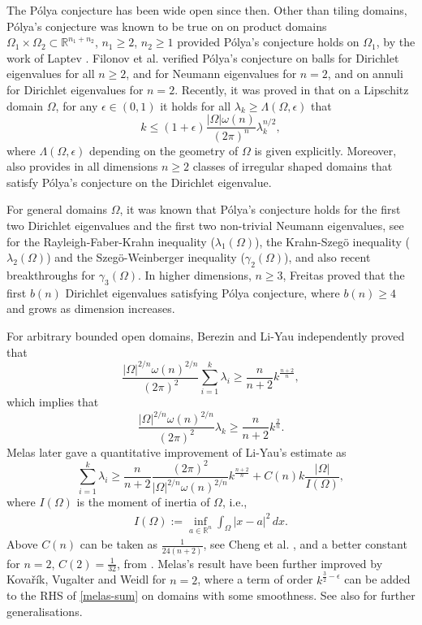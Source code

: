 \documentclass[11pt,twoside, leqno]{article}
\def\rr{{\mathbb R}}
\def\rn{{{\rr}^n}}
\numberwithin{equation}{section}
\begin{document}
The P\'olya conjecture has been wide open since then. Other than tiling domains,
P\'olya's conjecture was known to be true on on product domains $\Omega_1\times\Omega_2\subset\rr^{n_1+n_2}$, $n_1\ge 2$,
$n_2\ge 1$ provided P\'olya's conjecture holds on $\Omega_1$,  by the work of Laptev \cite{La97}. Filonov et al. \cite{FLPS23,FLPS25}
verified P\'olya's conjecture on balls for Dirichlet eigenvalues for all $n\ge 2$, and for Neumann eigenvalues for $n=2$,
and on annuli  for Dirichlet eigenvalues for $n=2$. Recently, it was proved in \cite{JL25} that on a Lipschitz domain $\Omega$, for any $\epsilon\in (0,1)$ it holds for all
$\lambda_k\ge \Lambda(\Omega,\epsilon)$ that
$$k\le (1+\epsilon)\frac{|\Omega|\omega(n)}{(2\pi)^n}\lambda_k^{n/2},$$
where $\Lambda(\Omega,\epsilon)$ depending on the geometry of $\Omega$ is given explicitly. Moreover, \cite{JL25} also provides in all dimensions $n\ge 2$ classes of
irregular shaped domains that satisfy P\'olya's conjecture on the Dirichlet eigenvalue.


For general domains $\Omega$, it was known that P\'olya's conjecture holds for the first two Dirichlet eigenvalues and the first two non-trivial Neumann eigenvalues,
see  \cite{Henrot06}  for the Rayleigh-Faber-Krahn inequality ($\lambda_1(\Omega)$),   the Krahn-Szeg\"o inequality  ($\lambda_2(\Omega)$) and the
Szeg\"o-Weinberger inequality ($\gamma_2(\Omega)$),  and also recent breakthroughs   \cite{BuHe19,GNP09}  for $\gamma_3(\Omega)$.  In higher dimensions, $n\ge 3$, Freitas \cite{Fre19} proved that
the first $b(n)$ Dirichlet eigenvalues satisfying P\'olya conjecture, where $b(n)\ge 4$ and grows as dimension increases.

For arbitrary bounded open domains,
Berezin \cite{Berezin72} and  Li-Yau \cite{LY83} independently proved that
\begin{equation}\label{ly-sum}
\frac{ |\Omega|^{2/n}\omega(n)^{2/n}}{(2\pi)^2}\sum_{i=1}^k\lambda_i \ge \frac{n}{n+2} k^{\frac{n+2}{n}},
\end{equation}
which implies that
\begin{equation}\label{ly-eigenvalue}
\frac{ |\Omega|^{2/n}\omega(n)^{2/n}}{(2\pi)^2} \lambda_k \ge \frac{n}{n+2} k^{\frac{2}{n}}.
\end{equation}
Melas \cite{Me02} later gave a quantitative improvement of Li-Yau's estimate
as
\begin{equation}\label{melas-sum}
\sum_{i=1}^k\lambda_i \ge \frac{n}{n+2} \frac{(2\pi)^2}{ |\Omega|^{2/n}\omega(n)^{2/n}} k^{\frac{n+2}{n}}+C(n)k\frac{|\Omega|}{I(\Omega)},
\end{equation}
where $I(\Omega)$ is the moment of inertia of $\Omega$, i.e.,
\begin{align}\label{I-def}
I(\Omega):=\inf_{a\in\rn}\int_\Omega|x-a|^2\,dx.
\end{align}
Above $C(n)$ can be taken as $\frac{1}{24(n+2)}$, see Cheng et al. \cite[p. 36]{CQW13}, and a better constant for $n=2$, $C(2)=\frac{1}{32}$, from  \cite[(16)]{KVW09}.
Melas's result have been further improved by Kova\v{r}\'ik, Vugalter and Weidl \cite{KVW09}  for $n=2$,
where  a term of order $k^{\frac 32-\epsilon}$ can be added to the RHS of \eqref{melas-sum}  on domains with some smoothness.
See also \cite{GLW11,JX23,Weidl08} for further generalisations.
\end{document}
